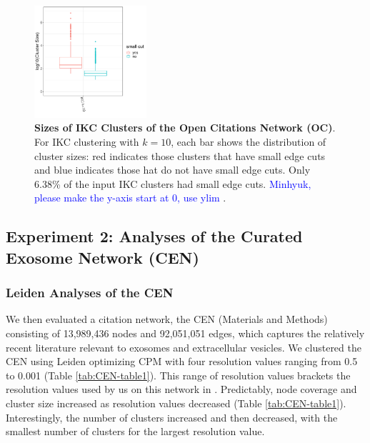 \documentclass[11pt]{article}   	%
\begin{document}
\begin{figure}[h!]
\centering
\includegraphics[width=0.37\textwidth]{figs/oc_ikc_istouched.pdf}
\caption[IKC Clusters of the Open Citations Network Impacted by CM]{\textbf{Sizes of IKC Clusters of the Open Citations Network (OC)}. For IKC clustering with $k=10$, each bar shows the distribution of cluster sizes:  red indicates those clusters that have small edge cuts and blue indicates those hat do not have small edge cuts. Only 6.38\% of the input IKC clusters had small edge cuts.
\textcolor{blue}{Minhyuk, please make the y-axis start at 0, use ylim}
.}
\label{fig:ocistouched-ikc}
\end{figure}



\clearpage
\subsection{Experiment 2: Analyses of the Curated Exosome Network (CEN)}

\subsubsection{Leiden Analyses of the CEN}

We then evaluated a citation network, the CEN (Materials and Methods) consisting of 13,989,436 nodes and 92,051,051 edges, which captures the relatively recent literature relevant to exosomes and extracellular vesicles. We clustered the CEN using Leiden optimizing CPM with  four resolution values ranging from 0.5 to 0.001 (Table \ref{tab:CEN-table1}). This range of resolution values brackets the resolution values used by us on this network in   \cite{Jakatdar_2022}.
Predictably, node coverage and cluster size increased as resolution values  decreased (Table \ref{tab:CEN-table1}).
Interestingly, the number of clusters increased and then decreased, with the smallest number of clusters for the largest
resolution value.
\end{document}
